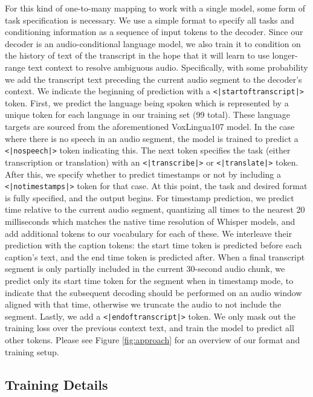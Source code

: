 \documentclass[nohyperref]{article}
\theoremstyle{plain}
\theoremstyle{definition}
\theoremstyle{remark}
\begin{document}
For this kind of one-to-many mapping to work with a single model, some form of task specification is necessary. We use a simple format to specify all tasks and conditioning information as a sequence of input tokens to the decoder. Since our decoder is an audio-conditional language model, we also train it to condition on the history of text of the transcript in the hope that it will learn to use longer-range text context to resolve ambiguous audio. Specifically, with some probability we add the transcript text preceding the current audio segment to the decoder's context. We indicate the beginning of prediction with a \texttt{<|startoftranscript|>} token. First, we predict the language being spoken which is represented by a unique token for each language in our training set (99 total). These language targets are sourced from the aforementioned VoxLingua107 model. In the case where there is no speech in an audio segment, the model is trained to predict a \texttt{<|nospeech|>} token indicating this. The next token specifies the task (either transcription or translation) with an \texttt{<|transcribe|>} or \texttt{<|translate|>} token. After this, we specify whether to predict timestamps or not by including a \texttt{<|notimestamps|>} token for that case. At this point, the task and desired format is fully specified, and the output begins. For timestamp prediction, we predict time relative to the current audio segment, quantizing all times to the nearest 20 milliseconds which matches the native time resolution of Whisper models, and add additional tokens to our vocabulary for each of these. We interleave their prediction with the caption tokens: the start time token is predicted before each caption's text, and the end time token is predicted after. When a final transcript segment is only partially included in the current 30-second audio chunk, we predict only its start time token for the segment when in timestamp mode, to indicate that the subsequent decoding should be performed on an audio window aligned with that time, otherwise we truncate the audio to not include the segment. Lastly, we add a \texttt{<|endoftranscript|>} token. We only mask out the training loss over the previous context text, and train the model to predict all other tokens. Please see Figure \ref{fig:approach} for an overview of our format and training setup.

\subsection{Training Details}\label{subsec:training-details}
\end{document}
